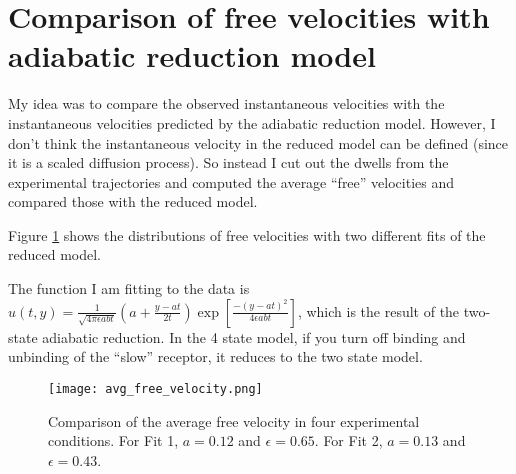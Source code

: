 \documentclass{article}
\begin{document}
\section{Comparison of free velocities with adiabatic reduction model}
\label{sec:comp-free-veloc}

My idea was to compare the observed instantaneous velocities with the
instantaneous velocities predicted by the adiabatic reduction
model. However, I don't think the instantaneous velocity in the
reduced model can be defined (since it is a scaled diffusion
process). So instead I cut out the dwells from the experimental
trajectories and computed the average ``free'' velocities and compared
those with the reduced model.

Figure \ref{fig:avg-free-vel} shows the distributions of free
velocities with two different fits of the reduced model.

The function I am fitting to the data is $u(t, y) =
\frac{1}{\sqrt{4\pi \epsilon a b t}} \left(a + \frac{y -
    at}{2t}\right) \exp \left[\frac{-(y-at)^2}{4\epsilon a b t}
\right]$, which is the result of the two-state adiabatic reduction. In
the 4 state model, if you turn off binding and unbinding of the
``slow'' receptor, it reduces to the two state model.

\begin{figure}
  \centering
  \texttt{[image: avg\_free\_velocity.png]}
  \caption{Comparison of the average free velocity in four
    experimental conditions. For Fit 1, $a = 0.12$ and $\epsilon =
    0.65$. For Fit 2, $a = 0.13$ and $\epsilon = 0.43$.}
  \label{fig:avg-free-vel}
\end{figure}



\end{document}
